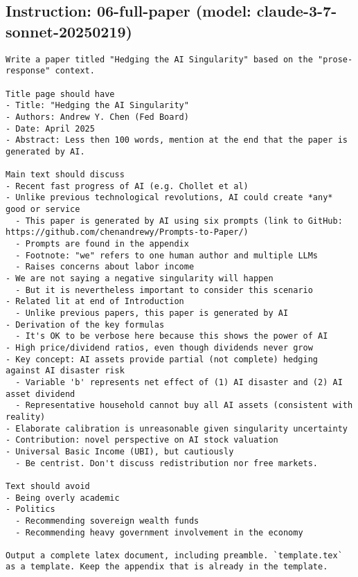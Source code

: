 \subsection*{Instruction: 06-full-paper  (model: claude-3-7-sonnet-20250219)}
\vspace{-1ex}
\begin{lstlisting}[language=text,breaklines=true,frame=single]
Write a paper titled "Hedging the AI Singularity" based on the "prose-response" context.

Title page should have
- Title: "Hedging the AI Singularity"
- Authors: Andrew Y. Chen (Fed Board)
- Date: April 2025
- Abstract: Less then 100 words, mention at the end that the paper is generated by AI.

Main text should discuss
- Recent fast progress of AI (e.g. Chollet et al)
- Unlike previous technological revolutions, AI could create *any* good or service
  - This paper is generated by AI using six prompts (link to GitHub: https://github.com/chenandrewy/Prompts-to-Paper/)
  - Prompts are found in the appendix
  - Footnote: "we" refers to one human author and multiple LLMs
  - Raises concerns about labor income
- We are not saying a negative singularity will happen
  - But it is nevertheless important to consider this scenario        
- Related lit at end of Introduction
  - Unlike previous papers, this paper is generated by AI
- Derivation of the key formulas
  - It's OK to be verbose here because this shows the power of AI
- High price/dividend ratios, even though dividends never grow
- Key concept: AI assets provide partial (not complete) hedging against AI disaster risk
  - Variable 'b' represents net effect of (1) AI disaster and (2) AI asset dividend
  - Representative household cannot buy all AI assets (consistent with reality)
- Elaborate calibration is unreasonable given singularity uncertainty
- Contribution: novel perspective on AI stock valuation
- Universal Basic Income (UBI), but cautiously
  - Be centrist. Don't discuss redistribution nor free markets.

Text should avoid      
- Being overly academic
- Politics
  - Recommending sovereign wealth funds
  - Recommending heavy government involvement in the economy

Output a complete latex document, including preamble. `template.tex` as a template. Keep the appendix that is already in the template.

\end{lstlisting}
\vspace{-3ex}